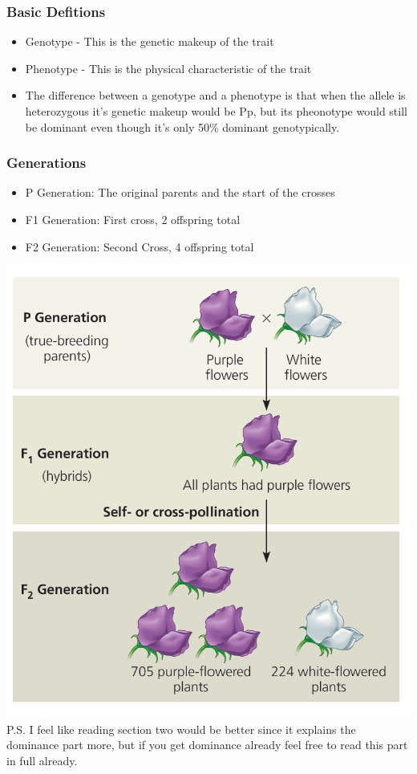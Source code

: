 \documentclass{article}
\begin{document}
\subsubsection*{Basic Defitions}
\begin{itemize}
    \item Genotype - This is the genetic makeup of the trait
    \item Phenotype - This is the physical characteristic of the trait
    \item The difference between a genotype and a phenotype is that when the allele is heterozygous it's genetic makeup would be Pp, but its pheonotype would still be dominant even though it's only 50\% dominant genotypically.
\end{itemize}
\subsubsection*{Generations}
\begin{itemize}
    \item P Generation: The original parents and the start of the crosses
    \item F1 Generation: First cross, 2 offspring total
    \item F2 Generation: Second Cross, 4 offspring total
\end{itemize}

\includegraphics*[scale=0.7]{generation.png}
P.S. I feel like reading section two would be better since it explains the dominance part more, but if you get dominance already feel free to read this part in full already. 
\end{document}
